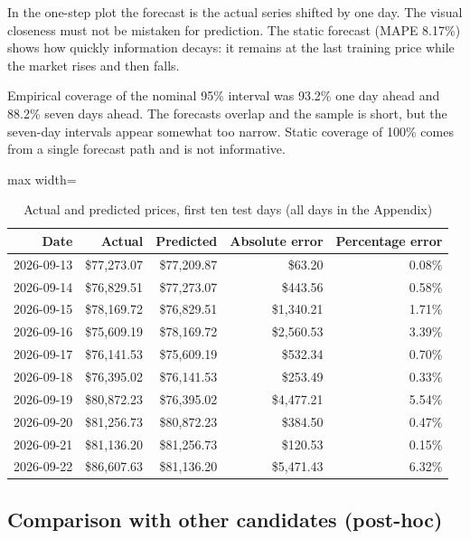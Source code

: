 \documentclass[11pt,a4paper]{article}
\begin{document}
In the one-step plot the forecast is the actual series shifted by one day. The visual closeness must not be mistaken for prediction. The static forecast (MAPE 8.17\%) shows how quickly information decays: it remains at the last training price while the market rises and then falls.

Empirical coverage of the nominal 95\% interval was 93.2\% one day ahead and 88.2\% seven days ahead. The forecasts overlap and the sample is short, but the seven-day intervals appear somewhat too narrow. Static coverage of 100\% comes from a single forecast path and is not informative.

\begin{table}[H]
\centering
\caption{Actual and predicted prices, first ten test days (all days in the Appendix)}
\small
\setlength{\tabcolsep}{4pt}
\begin{adjustbox}{max width=\linewidth}
\begin{tabular}{rrrrr}
\toprule
\textbf{Date} & \textbf{Actual} & \textbf{Predicted} & \textbf{Absolute error} & \textbf{Percentage error} \\
\midrule
2026-09-13 & \$77,273.07 & \$77,209.87 & \$63.20 & 0.08\% \\
2026-09-14 & \$76,829.51 & \$77,273.07 & \$443.56 & 0.58\% \\
2026-09-15 & \$78,169.72 & \$76,829.51 & \$1,340.21 & 1.71\% \\
2026-09-16 & \$75,609.19 & \$78,169.72 & \$2,560.53 & 3.39\% \\
2026-09-17 & \$76,141.53 & \$75,609.19 & \$532.34 & 0.70\% \\
2026-09-18 & \$76,395.02 & \$76,141.53 & \$253.49 & 0.33\% \\
2026-09-19 & \$80,872.23 & \$76,395.02 & \$4,477.21 & 5.54\% \\
2026-09-20 & \$81,256.73 & \$80,872.23 & \$384.50 & 0.47\% \\
2026-09-21 & \$81,136.20 & \$81,256.73 & \$120.53 & 0.15\% \\
2026-09-22 & \$86,607.63 & \$81,136.20 & \$5,471.43 & 6.32\% \\
\bottomrule
\end{tabular}
\end{adjustbox}
\end{table}

\subsection{Comparison with other candidates (post-hoc)}
\end{document}
